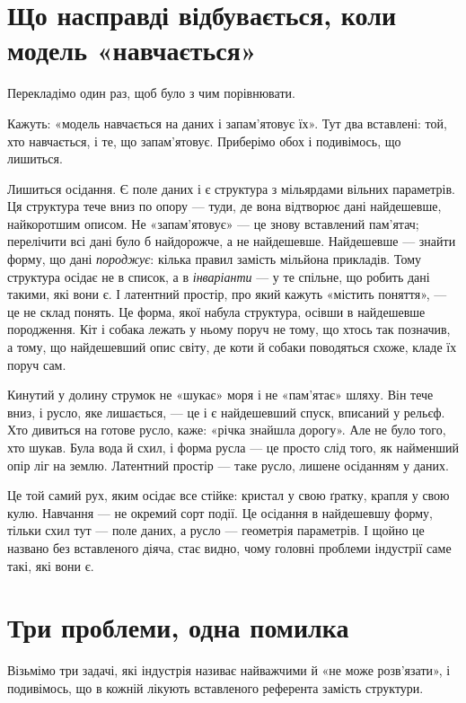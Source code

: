 \documentclass[12pt, a4paper, openany]{book}
\begin{document}
\section{Що насправді відбувається, коли модель «навчається»}

Перекладімо один раз, щоб було з чим порівнювати.

Кажуть: «модель навчається на даних і запам'ятовує їх». Тут два вставлені: той, хто навчається, і те, що запам'ятовує. Приберімо обох і подивімось, що лишиться.

Лишиться осідання. Є поле даних і є структура з мільярдами вільних параметрів. Ця структура тече вниз по опору --- туди, де вона відтворює дані найдешевше, найкоротшим описом. Не «запам'ятовує» --- це знову вставлений пам'ятач; перелічити всі дані було б найдорожче, а не найдешевше. Найдешевше --- знайти форму, що дані \emph{породжує}: кілька правил замість мільйона прикладів. Тому структура осідає не в список, а в \emph{інваріанти} --- у те спільне, що робить дані такими, які вони є. І латентний простір, про який кажуть «містить поняття», --- це не склад понять. Це форма, якої набула структура, осівши в найдешевше породження. Кіт і собака лежать у ньому поруч не тому, що хтось так позначив, а тому, що найдешевший опис світу, де коти й собаки поводяться схоже, кладе їх поруч сам.

\begin{analogybox}
Кинутий у долину струмок не «шукає» моря і не «пам'ятає» шляху. Він тече вниз, і русло, яке лишається, --- це і є найдешевший спуск, вписаний у рельєф. Хто дивиться на готове русло, каже: «річка знайшла дорогу». Але не було того, хто шукав. Була вода й схил, і форма русла --- це просто слід того, як найменший опір ліг на землю. Латентний простір --- таке русло, лишене осіданням у даних.
\end{analogybox}

Це той самий рух, яким осідає все стійке: кристал у свою ґратку, крапля у свою кулю. Навчання --- не окремий сорт події. Це осідання в найдешевшу форму, тільки схил тут --- поле даних, а русло --- геометрія параметрів. І щойно це названо без вставленого діяча, стає видно, чому головні проблеми індустрії саме такі, які вони є.

\section{Три проблеми, одна помилка}

Візьмімо три задачі, які індустрія називає найважчими й «не може розв'язати», і подивімось, що в кожній лікують вставленого референта замість структури.
\end{document}
